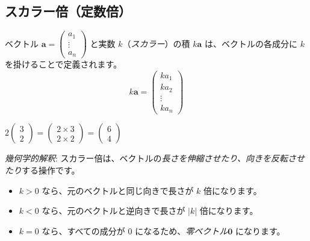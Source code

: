 \subsection{スカラー倍（定数倍）}

\begin{dfn}[ベクトルのスカラー倍] \label{vector_scalar}
ベクトル $\bm{a} = \begin{pmatrix} a_1 \\ \vdots \\ a_n \end{pmatrix}$ と実数 $k$（\emph{スカラー}）の積 $k\bm{a}$ は、ベクトルの各成分に $k$ を掛けることで定義されます。
\[k\bm{a} = \begin{pmatrix} k a_1 \\ k a_2 \\ \vdots \\ k a_n \end{pmatrix}\]
\end{dfn}

\begin{ex}
$2 \begin{pmatrix} 3 \\ 2 \end{pmatrix} = \begin{pmatrix} 2 \times 3 \\ 2 \times 2 \end{pmatrix} = \begin{pmatrix} 6 \\ 4 \end{pmatrix}$
\end{ex}

\emph{幾何学的解釈}: スカラー倍は、ベクトルの\emph{長さを伸縮させたり、向きを反転させたり}する操作です。
\begin{itemize}
\item $k > 0$ なら、元のベクトルと同じ向きで長さが $k$ 倍になります。
\item $k < 0$ なら、元のベクトルと逆向きで長さが $|k|$ 倍になります。
\item $k = 0$ なら、すべての成分が $0$ になるため、\emph{零ベクトル}$\bm{0}$ になります。
\end{itemize}

